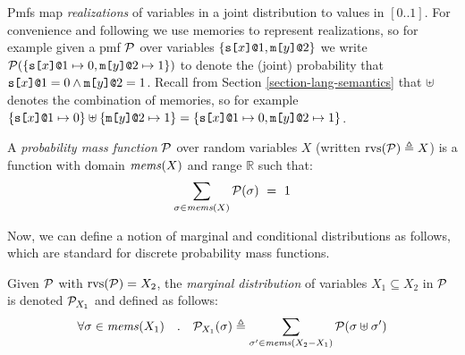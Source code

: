 Pmfs map \emph{realizations} of variables in a joint
distribution to values in $[0..1]$. For convenience and following
\cite{barthe2019probabilistic,skalka-near-ppdp24} we use memories to
represent realizations, so for example given a pmf $\mathcal{P}$ over
variables $\{ \texttt{s[}x\texttt{]}\texttt{@}1, \texttt{m[}y\texttt{]}\texttt{@}2 \}$ we write $\mathcal{P}(\{
\texttt{s[}x\texttt{]}\texttt{@}1 \mapsto 0, \texttt{m[}y\texttt{]}\texttt{@}2 \mapsto 1 \})$ to
denote the (joint) probability that $\texttt{s[}x\texttt{]}\texttt{@}1 = 0 \wedge
\texttt{m[}y\texttt{]}\texttt{@}2 = 1$. Recall from Section
\ref{section-lang-semantics} that $\uplus$ denotes the combination of
memories, so for example $\{ \texttt{s[}x\texttt{]}\texttt{@}1 \mapsto 0\} \uplus
\{\texttt{m[}y\texttt{]}\texttt{@}2 \mapsto 1 \} = \{ \texttt{s[}x\texttt{]}\texttt{@}1 \mapsto 0,
\texttt{m[}y\texttt{]}\texttt{@}2 \mapsto 1 \}$.
\begin{definition}
  A \emph{probability mass function} $\mathcal{P}$ over random variables $X$
  (written $\mathrm{rvs}(\mathcal{P}) \triangleq X$) is a function
  with domain $\mathit{mems}(X)$ and range $\mathbb{R}$ such that:
  $$
  \sum_{\sigma \in \mathit{mems}(X)} \mathcal{P}(\sigma) \  = \ 1
  $$
\end{definition}
Now, we can define a notion of marginal and conditional
distributions as follows, which are standard for discrete
probability mass functions. 
\begin{definition}
  Given $\mathcal{P}$ with $\mathrm{rvs}(\mathcal{P}) = X_2$, the \emph{marginal distribution}
  of variables $X_1 \subseteq X_2$ in $\mathcal{P}$ is denoted ${\mathcal{P}}_{X_1}$ and defined as follows:
  $$
  \forall \sigma \in \mathit{mems}(X_1) \quad . \quad {\mathcal{P}}_{X_1}(\sigma) \triangleq
  \sum_{\sigma' \in \mathit{mems}(X_2-X_1)} \mathcal{P}(\sigma \uplus \sigma')
  $$
\end{definition}

